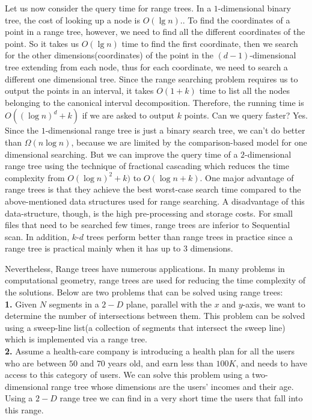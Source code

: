 \documentclass[letterpaper,11pt]{article}
\begin{document}
Let us now consider the query time for range trees. In a $1$-dimensional binary tree, the cost of looking up a node is $O(\lg n)$.\cite[p.~292]{clrs}. To find the coordinates of a point in a range tree, however, we need to find all the different coordinates of the point. So it takes us $O(\lg n)$ time to find the first coordinate, then we search for the other dimensions(coordinates) of the point in the $(d-1)$-dimensional tree extending from each node, thus for each coordinate, we need to search a different one dimensional tree. Since the range searching problem requires us to output the points in an 
\newpage
\vspace*{0.2cm}
interval, it takes $O(1+k)$ time to list all the nodes belonging to the canonical interval decomposition. Therefore, the running time is $O((\log n)^d + k)$ if we are asked to output $k$ points.\cite[p.~183]{brass2008advanced} Can we query faster? Yes. Since the $1$-dimensional range tree is just a binary search tree, we can't do better than $\Omega (n \log n)$, because we are limited by the comparison-based model for one dimensional searching.\cite[p.~292]{clrs} \cite[p.~184]{brass2008advanced} But we can improve the query time of a $2$-dimensional range tree using the technique of fractional cascading which reduces the time complexity from $O(\log n)^2 + k)$ to $O(\log n + k)$.\cite[p.~184]{brass2008advanced}
One major advantage of range trees is that they achieve the best worst-case search time compared to the above-mentioned data structures used for range searching.\cite{Friedman} A disadvantage of this data-structure, though, is the high pre-processing and storage costs.\cite[p.~404]{Friedman} For small files that need to be searched few times, range trees are inferior to Sequential scan. In addition, $k$-$d$ trees perform better than range trees in practice since a range tree is practical mainly when it has up to $3$ dimensions.\cite[p.~405]{Friedman}

Nevertheless, Range trees have numerous applications. In many problems in computational geometry, range trees are used for reducing the time complexity of the solutions.\cite{sturzurange} Below are two problems that can be solved using range trees:\\
\textbf{1.} Given $N$ segments in a $2-D$ plane, parallel with the $x$ and $y$-axis, we want to determine the number of intersections between them. This problem can be solved using a sweep-line list(a collection of segments that intersect the sweep line) which is implemented via a range tree.\cite{sturzurange}\\
\textbf{2.} Assume a health-care company is introducing a health plan for all the users who are between $50$ and $70$ years old, and earn less than $100K$, and needs to have access to this category of users. We can solve this problem using a two-dimensional range tree whose dimensions are the users' incomes and their age. Using a $2-D$ range tree we can find in a very short time the users that fall into this range.\\



\end{document}
